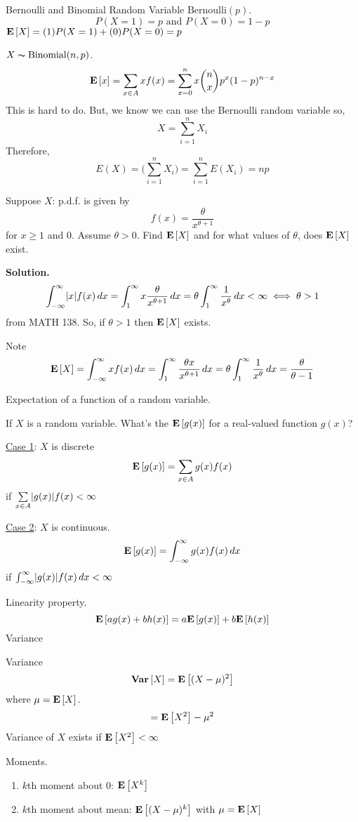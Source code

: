 \begin{Example}{Bernoulli and Binomial Random Variable}{}
    $ \text{Bernoulli}(p) $.
    \[ P(X=1)=p\text{ and }P(X=0)=1-p \]
    $ \bm{\mathrm{E}}\left[X\right]=(1)P(X=1)+(0)P(X=0)=p $

    $ X \thicksim \operatorname{Binomial}(n,p) $.
    \[ \bm{\mathrm{E}}\left[x\right]=\sum\limits_{x\in A}x f(x)=\sum\limits_{x=0}^{n} x
        \binom{n}{x}p^x(1-p)^{n-x}  \]
    This is hard to do. But, we know we can use the Bernoulli random variable
    so,
    \[ X=\sum\limits_{i=1}^{n} X_i \]
    Therefore,
    \[ E(X)=\biggl(\sum\limits_{i=1}^{n} X_i\biggr)=\sum\limits_{i=1}^{n}
        E(X_i)=np \]
\end{Example}
\begin{Example}{}{}
    Suppose $ X $: p.d.f. is given by
    \[ f(x)=\frac{\theta}{x^{\theta+1}}  \]
    for $ x\geqslant 1 $ and $ 0 $. Assume $ \theta>0 $.
    Find $ \bm{\mathrm{E}}\left[X\right] $ and for what values of $ \theta $,
    does $ \bm{\mathrm{E}}\left[X\right] $ exist.

    \textbf{Solution.}
    \[ \int_{-\infty}^{\infty} \lvert x\rvert f(x)\, d{x}=
        \int_{1}^{\infty} x \frac{\theta}{x^{\theta+1}} \, d{x}
        =\theta \int_{1}^{\infty} \frac{1}{x^{\theta}} \, d{x} <\infty
        \iff \theta>1 \]
    from MATH 138. So, if $ \theta>1 $ then $ \bm{\mathrm{E}}\left[X\right] $ exists.

    Note
    \[ \bm{\mathrm{E}}\left[X\right]=\int_{-\infty}^{\infty} xf(x)\, d{x}=
        \int_{1}^{\infty} \frac{\theta x}{x^{\theta+1}} \, d{x}
        =\theta \int_{1}^{\infty} \frac{1}{x^{\theta}} \, d{x}
        =\frac{\theta}{\theta-1}   \]

\end{Example}

Expectation of a function of a random variable.

If $ X $ is a random variable.
What's the $ \bm{\mathrm{E}}\left[g(x)\right] $ for a real-valued function $ g(x) $?

\underline{Case 1}: $ X $ is discrete
\[ \bm{\mathrm{E}}\left[g(x)\right]=\sum\limits_{x\in A}g(x)f(x) \]
if $ \sum\limits_{x\in A}\lvert g(x)\rvert f(x)<\infty $

\underline{Case 2}: $ X $ is continuous.
\[ \bm{\mathrm{E}}\left[g(x)\right]=\int_{-\infty}^{\infty} g(x)f(x)\, d{x} \]
if $ \int_{-\infty}^{\infty} \lvert g(x)\rvert f(x)\, d{x} <\infty $

Linearity property.
\[ \bm{\mathrm{E}}\left[a g(x)+b h(x)\right]=a\bm{\mathrm{E}}\left[g(x)\right]+b\bm{\mathrm{E}}\left[h(x)\right] \]
Variance
\begin{Definition}{Variance}{}
    \[ \bm{\mathrm{Var}}\left[X\right]=\bm{\mathrm{E}}\left[(X-\mu)^2\right] \]
    where $ \mu=\bm{\mathrm{E}}\left[X\right] $.
    \[ =\bm{\mathrm{E}}\left[X^2\right]-\mu^2 \]
    Variance of $ X $ exists if $ \bm{\mathrm{E}}\left[X^2\right]<\infty $
\end{Definition}
Moments.
\begin{enumerate}
    \item $ k $th moment about $ 0 $: $ \bm{\mathrm{E}}\left[X^k\right] $
    \item $ k $th moment about mean: $ \bm{\mathrm{E}}\left[(X-\mu)^k\right] $
          with $ \mu=\bm{\mathrm{E}}\left[X\right] $
\end{enumerate}

